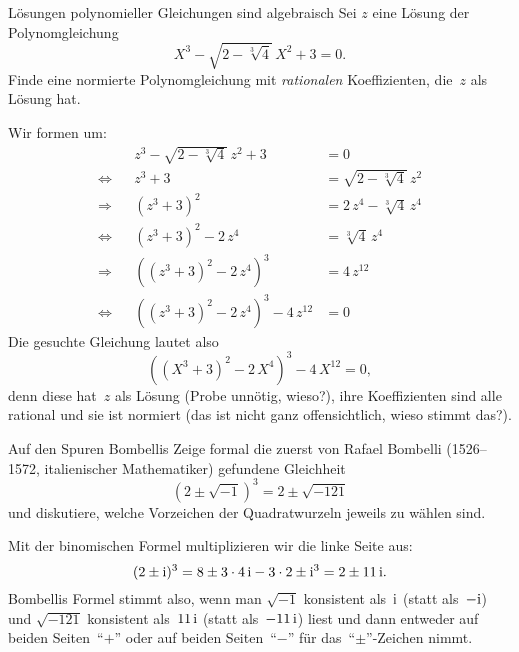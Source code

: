 \documentclass{algblatt}
\begin{document}
\vspace*{-1.2cm}

\begin{aufgabe}{Lösungen polynomieller Gleichungen sind algebraisch}
Sei $z$ eine Lösung der Polynomgleichung
\[ X^3 - \sqrt{2 - \sqrt[3]{4}} \, X^2 + 3 = 0. \]
Finde eine normierte Polynomgleichung mit \emph{rationalen} Koeffizienten,
die~$z$ als Lösung hat.
\begin{loesung}
Wir formen um:
\begin{align*}
  &&z^3 - \sqrt{2 - \sqrt[3]{4}} \, z^2 + 3 &= 0 \\
  \Longleftrightarrow&&
  z^3 + 3 &= \sqrt{2 - \sqrt[3]{4}} \, z^2 \\
  \Longrightarrow&&
  (z^3 + 3)^2 &= 2 \, z^4 - \sqrt[3]{4} \, z^4 \\
  \Longleftrightarrow&&
  (z^3 + 3)^2 - 2 \, z^4 &= \sqrt[3]{4} \, z^4 \\
  \Longrightarrow&&
  ((z^3 + 3)^2 - 2 \, z^4)^3 &= 4 \, z^{12} \\
  \Longleftrightarrow&&
  ((z^3 + 3)^2 - 2 \, z^4)^3 - 4 \, z^{12} &= 0
\end{align*}
Die gesuchte Gleichung lautet also
\[ ((X^3 + 3)^2 - 2 \, X^4)^3 - 4 \, X^{12} = 0, \]
denn diese hat~$z$ als Lösung (Probe unnötig, wieso?), ihre Koeffizienten sind
alle rational und sie ist normiert (das ist nicht ganz offensichtlich, wieso
stimmt das?).
\end{loesung}
\end{aufgabe}

\begin{aufgabe}{Auf den Spuren Bombellis}
Zeige formal die zuerst von Rafael Bombelli (1526--1572, italienischer
Mathematiker) gefundene
Gleichheit
\[
    (2 \pm \sqrt{-1})^3 = 2 \pm \sqrt{-121}
\]
und diskutiere, welche Vorzeichen der Quadratwurzeln jeweils zu wählen sind.
\begin{loesung}
Mit der binomischen Formel multiplizieren wir die linke Seite aus:
\[ (2 \pm \mathrm{i})^3 = 8 \pm 3 \cdot 4 \, \mathrm{i} - 3 \cdot 2 \pm \mathrm{i}^3 =
  2 \pm 11 \, \mathrm{i}. \]
Bombellis Formel stimmt also, wenn man $\sqrt{-1}$ konsistent als~$\mathrm{i}$ (statt
als~$-\mathrm{i}$) und $\sqrt{-121}$ konsistent als~$11 \,\mathrm{i}$ (statt als~$-11\,\mathrm{i}$)
liest und dann entweder auf beiden Seiten~"`$+$"' oder auf beiden Seiten~"`$-$"' für
das~"`$\pm$"'-Zeichen nimmt.
\end{loesung}
\end{aufgabe}
\end{document}
